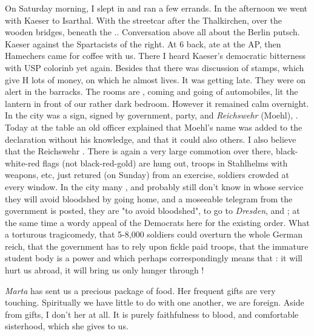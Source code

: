 \documentclass{article}
\begin{document}
On Saturday morning, I slept in and ran a few errands. In the afternoon we went with Kaeser to Isarthal. With the streetcar after the Thalkirchen, over the wooden bridges, beneath the .\skipped. Conversation above all about the Berlin putsch. Kaeser  against the Spartacists of the right. At 6 back, ate at the AP, then Hamechers came for coffee with us. There I heard Kaeser's democratic bitterness with USP colorinb yet again. Besides that there was discussion of stamps, which give H lots of money, on which he almost lives. It was getting late. They were on alert in the barracks. The rooms are , coming and going of automobiles, lit the lantern in front of our rather dark bedroom. However it remained calm overnight. In the city was a sign, signed by government, party, and \textit{Reichswehr} (Moehl), . Today at the table an old officer explained that Moehl's name was added to the declaration without his knowledge, and that it could also  others. I also believe that the Reichswehr . There is again a very large commotion over there, black-white-red flags (not black-red-gold) are hung out, troops in Stahlhelms with weapons, etc, just retured (on Sunday) from an exercise, soldiers crowded at every window. In the city many ,  and probably still don't know in whose service they will avoid bloodshed by going home, and a moseeable telegram from the government is posted, they are "to avoid bloodshed", to go to \textit{Dresden}, and ; at the same time a wordy appeal of the Democrats here for the existing order. What a torturous tragicomedy, that 5-8,000 soldiers could overturn the whole German reich, that the government has to rely upon fickle paid troops, that the immature student body is a power and which perhaps correspondingly means that : it will hurt us abroad, it will bring us only  hunger through !


\textit{Marta} has sent us a precious package of food. Her frequent gifts are very touching. Spiritually we have little to do with one another, we are foreign. Aside from gifts, I don't  her at all. It is purely faithfulness to blood, and comfortable sisterhood, which she gives to us. 
\end{document}

